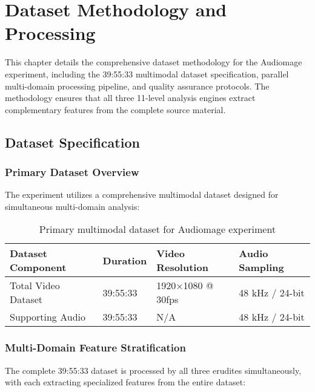 \chapter{Dataset Methodology and Processing}

\begin{tcolorbox}[colback=DarkSkyBlue!5!white,colframe=DarkSkyBlue!75!black,title=Chapter Overview]
This chapter details the comprehensive dataset methodology for the Audiomage experiment, including the 39:55:33 multimodal dataset specification, parallel multi-domain processing pipeline, and quality assurance protocols. The methodology ensures that all three 11-level analysis engines extract complementary features from the complete source material.
\end{tcolorbox}

\section{Dataset Specification}

\subsection{Primary Dataset Overview}

The experiment utilizes a comprehensive multimodal dataset designed for simultaneous multi-domain analysis:

\begin{table}[h]
\centering
\begin{tabular}{|l|l|l|l|}
\hline
\textbf{Dataset Component} & \textbf{Duration} & \textbf{Video Resolution} & \textbf{Audio Sampling} \\
\hline
Total Video Dataset & 39:55:33 & 1920×1080 @ 30fps & 48 kHz / 24-bit \\
\hline
Supporting Audio & 39:55:33 & N/A & 48 kHz / 24-bit \\
\hline
\end{tabular}
\caption{Primary multimodal dataset for Audiomage experiment}
\end{table}

\subsection{Multi-Domain Feature Stratification}

The complete 39:55:33 dataset is processed by all three erudites simultaneously, with each extracting specialized features from the entire dataset:

